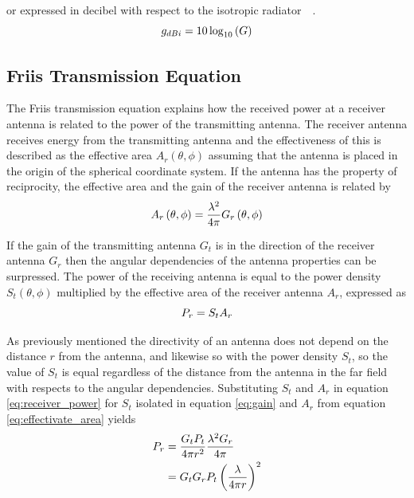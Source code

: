or expressed in decibel with respect to the isotropic radiator~\cite[p. 10]{ant_beam_form}~\cite[pp. 1.8-1.10]{ant_eng_hk}.
\begin{equation} \label{eq:gain_dbi}
    g_{dBi} = 10 \log_{10}\left(G\right)
    \tagaddtext{[\si{\decibel}]}
\end{equation}

\subsection{Friis Transmission Equation} \label{ss:friis}
The Friis transmission equation explains how the received power at a receiver antenna is related to the power of the transmitting antenna. The receiver antenna receives energy from the transmitting antenna and the effectiveness of this is described as the effective area $A_r\left( \theta, \phi \right)$ assuming that the antenna is placed in the origin of the spherical coordinate system. If the antenna has the property of reciprocity, the effective area and the gain of the receiver antenna is related by 
\begin{equation} \label{eq:effectivate_area}
    A_r \left( \theta, \phi \right) = \frac{\lambda^2}{4 \pi} G_r \left( \theta, \phi \right)
    \tagaddtext{[\si{\meter\squared}]}
\end{equation}

If the gain of the transmitting antenna $G_t$ is in the direction of the receiver antenna $G_r$ then the angular dependencies of the antenna properties can be surpressed. The power of the receiving antenna is equal to the power density $S_t \left(\theta, \phi\right)$ multiplied by the effective area of the receiver antenna $A_r$, expressed as
\begin{equation} \label{eq:receiver_power}
    P_r = S_t A_r
    \tagaddtext{[\si{\watt}]}
\end{equation} 

As previously mentioned the directivity of an antenna does not depend on the distance $r$ from the antenna, and likewise so with the power density $S_t$, so the value of $S_t$ is equal regardless of the distance from the antenna in the far field with respects to the angular dependencies. Substituting $S_t$ and $A_r$ in equation \ref{eq:receiver_power} for $S_t$ isolated in equation \ref{eq:gain} and $A_r$ from equation \ref{eq:effectivate_area} yields
\begin{equation} \label{eq:friis}
    \begin{split}
        P_r & = \frac{G_t P_t}{4 \pi r^2} \frac{\lambda^2 G_r}{4 \pi} \\
        & = G_t  G_r P_t \left( \frac{\lambda}{4 \pi r} \right)^2
        \tagaddtext{[\si{\watt}]}
    \end{split}
\end{equation} 

